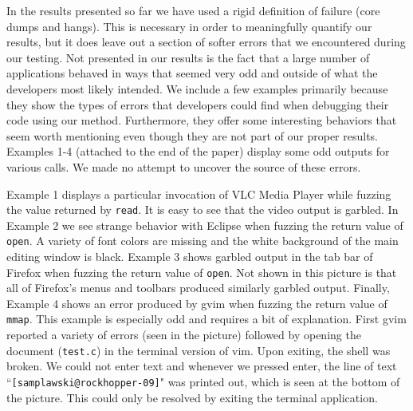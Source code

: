 In the results presented so far we have used a rigid definition of failure (core dumps and hangs). This is necessary in order to meaningfully quantify our results, but it does leave out a section of softer errors that we encountered during our testing. Not presented in our results is the fact that a large number of applications behaved in ways that seemed very odd and outside of what the developers most likely intended. We include a few examples primarily because they show the types of errors that developers could find when debugging their code using our method. Furthermore, they offer some interesting behaviors that seem worth mentioning even though they are not part of our proper results. Examples 1-4 (attached to the end of the paper) display some odd outputs for various calls. We made no attempt to uncover the source of these errors.

Example 1 displays a particular invocation of VLC Media Player while fuzzing the value returned by \texttt{read}. It is easy to see that the video output is garbled. In Example 2 we see strange behavior with Eclipse when fuzzing the return value of \texttt{open}. A variety of font colors are missing and the white background of the main editing window is black. Example 3 shows garbled output in the tab bar of Firefox when fuzzing the return value of \texttt{open}. Not shown in this picture is that all of Firefox's menus and toolbars produced similarly garbled output. Finally, Example 4 shows an error produced by gvim when fuzzing the return value of \texttt{mmap}. This example is especially odd and requires a bit of explanation. First gvim reported a variety of errors (seen in the picture) followed by opening the document (\texttt{test.c}) in the terminal version of vim. Upon exiting, the shell was broken. We could not enter text and whenever we pressed enter, the line of text ``\texttt{[samplawski@rockhopper-09]}" was printed out, which is seen at the bottom of the picture. This could only be resolved by exiting the terminal application.
